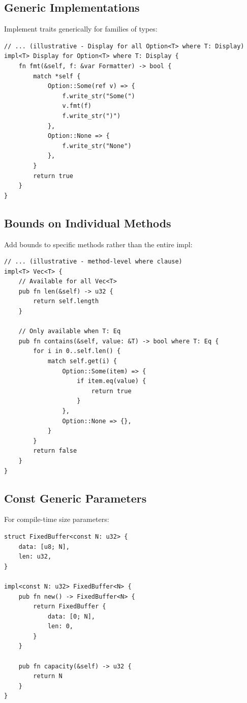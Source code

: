 \subsection{Generic Implementations}

Implement traits generically for families of types:

\begin{lstlisting}
// ... (illustrative - Display for all Option<T> where T: Display)
impl<T> Display for Option<T> where T: Display {
    fn fmt(&self, f: &var Formatter) -> bool {
        match *self {
            Option::Some(ref v) => {
                f.write_str("Some(")
                v.fmt(f)
                f.write_str(")")
            },
            Option::None => {
                f.write_str("None")
            },
        }
        return true
    }
}
\end{lstlisting}

\subsection{Bounds on Individual Methods}

Add bounds to specific methods rather than the entire impl:

\begin{lstlisting}
// ... (illustrative - method-level where clause)
impl<T> Vec<T> {
    // Available for all Vec<T>
    pub fn len(&self) -> u32 {
        return self.length
    }

    // Only available when T: Eq
    pub fn contains(&self, value: &T) -> bool where T: Eq {
        for i in 0..self.len() {
            match self.get(i) {
                Option::Some(item) => {
                    if item.eq(value) {
                        return true
                    }
                },
                Option::None => {},
            }
        }
        return false
    }
}
\end{lstlisting}

\subsection{Const Generic Parameters}

For compile-time size parameters:

\begin{lstlisting}
struct FixedBuffer<const N: u32> {
    data: [u8; N],
    len: u32,
}

impl<const N: u32> FixedBuffer<N> {
    pub fn new() -> FixedBuffer<N> {
        return FixedBuffer {
            data: [0; N],
            len: 0,
        }
    }

    pub fn capacity(&self) -> u32 {
        return N
    }
}
\end{lstlisting}

